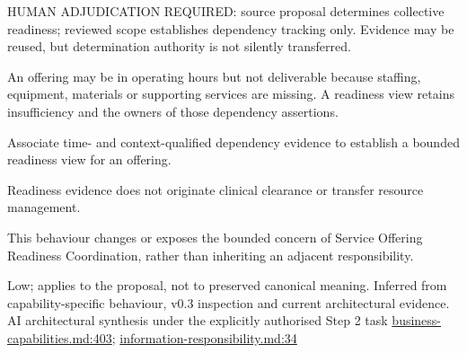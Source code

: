 HUMAN ADJUDICATION REQUIRED: source proposal determines collective readiness; reviewed scope establishes dependency tracking only. Evidence may be reused, but determination authority is not silently transferred.



An offering may be in operating hours but not deliverable because staffing, equipment, materials or supporting services are missing. A readiness view retains insufficiency and the owners of those dependency assertions.



Associate time- and context-qualified dependency evidence to establish a bounded readiness view for an offering.



Readiness evidence does not originate clinical clearance or transfer resource management.



This behaviour changes or exposes the bounded concern of Service Offering Readiness Coordination, rather than inheriting an adjacent responsibility.


Low; applies to the proposal, not to preserved canonical meaning.
Inferred from capability-specific behaviour, v0.3 inspection and current architectural evidence. AI architectural synthesis under the explicitly authorised Step 2 task \hyperref[evidence:a4c0900c47c945d9]{business-capabilities.md:403}; \hyperref[evidence:be61392fefb4bb10]{information-responsibility.md:34}
